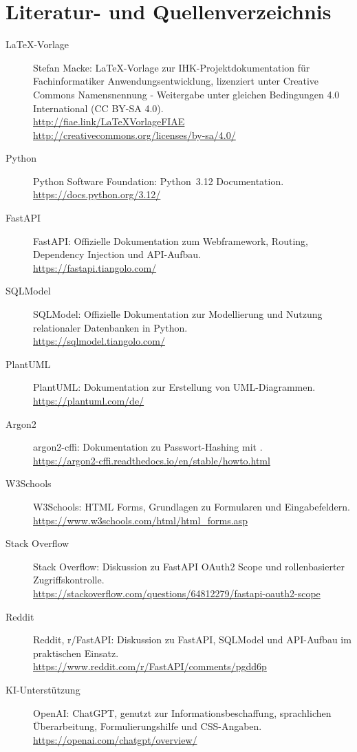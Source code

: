 \clearpage
\section*{Literatur- und Quellenverzeichnis}

\begin{description}
  \item[LaTeX-Vorlage] Stefan Macke: LaTeX-Vorlage zur IHK-Projektdokumentation
  für Fachinformatiker Anwendungsentwicklung, lizenziert unter Creative Commons
  Namensnennung - Weitergabe unter gleichen Bedingungen 4.0 International
  (CC BY-SA 4.0).\\
  \url{http://fiae.link/LaTeXVorlageFIAE}\\
  \url{http://creativecommons.org/licenses/by-sa/4.0/}

  \item[Python] Python Software Foundation: Python~3.12 Documentation.\\
  \url{https://docs.python.org/3.12/}

  \item[FastAPI] FastAPI: Offizielle Dokumentation zum Webframework, Routing,
  Dependency Injection und API-Aufbau.\\
  \url{https://fastapi.tiangolo.com/}

  \item[SQLModel] SQLModel: Offizielle Dokumentation zur Modellierung und
  Nutzung relationaler Datenbanken in Python.\\
  \url{https://sqlmodel.tiangolo.com/}

  \item[PlantUML] PlantUML: Dokumentation zur Erstellung von UML-Diagrammen.\\
  \url{https://plantuml.com/de/}

  \item[Argon2] argon2-cffi: Dokumentation zu Passwort-Hashing mit
  .\\
  \url{https://argon2-cffi.readthedocs.io/en/stable/howto.html}

  \item[W3Schools] W3Schools: HTML Forms, Grundlagen zu Formularen und
  Eingabefeldern.\\
  \url{https://www.w3schools.com/html/html_forms.asp}

  \item[Stack Overflow] Stack Overflow: Diskussion zu FastAPI OAuth2 Scope und
  rollenbasierter Zugriffskontrolle.\\
  \url{https://stackoverflow.com/questions/64812279/fastapi-oauth2-scope}

  \item[Reddit] Reddit, r/FastAPI: Diskussion zu FastAPI, SQLModel und
  API-Aufbau im praktischen Einsatz.\\
  \url{https://www.reddit.com/r/FastAPI/comments/pgdd6p}

  \item[KI-Unterstützung] OpenAI: ChatGPT, genutzt zur Informationsbeschaffung, sprachlichen
  Überarbeitung, Formulierungshilfe und CSS-Angaben.\\
  \url{https://openai.com/chatgpt/overview/}
\end{description}
